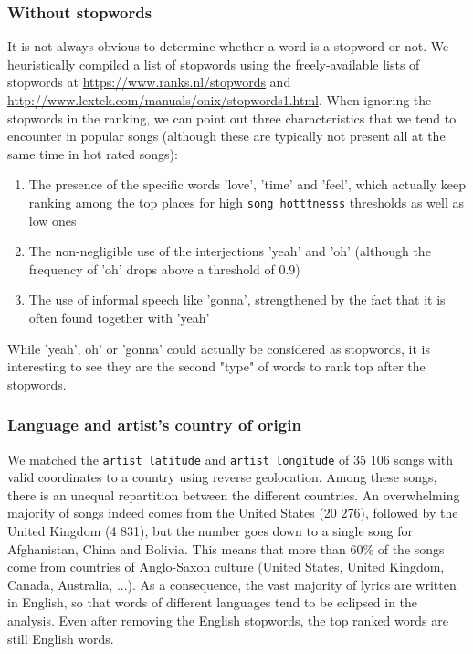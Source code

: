 \documentclass[11pt]{article}
\renewcommand\_{\textunderscore\allowbreak}
\begin{document}
\subsubsection{Without stopwords}
It is not always obvious to determine whether a word is a stopword or not. We heuristically compiled a list of stopwords using the freely-available lists of stopwords at \url{https://www.ranks.nl/stopwords} and \url{http://www.lextek.com/manuals/onix/stopwords1.html}.
When ignoring the stopwords in the ranking, we can point out three characteristics that we tend to encounter in popular songs (although these are typically not present all at the same time in hot rated songs):
\begin{enumerate}
\itemsep 0mm
\item The presence of the specific words 'love', 'time' and 'feel', which actually keep ranking among the top places for high \texttt{song hotttnesss} thresholds as well as low ones
\item The non-negligible use of the interjections 'yeah' and 'oh' (although the frequency of 'oh' drops above a threshold of 0.9)
\item The use of informal speech like 'gonna', strengthened by the fact that it is often found together with 'yeah'
\end{enumerate}
While 'yeah', oh' or 'gonna' could actually be considered as stopwords, it is interesting to see they are the second "type" of words to rank top after the stopwords.

\subsubsection{Language and artist's country of origin}
We matched the \texttt{artist latitude} and \texttt{artist longitude} of 35 106 songs with valid coordinates to a country using reverse geolocation.  %
Among these songs, there is an unequal repartition between the different countries.
An overwhelming majority of songs indeed comes from the United States (20 276), followed by the United Kingdom (4 831), but the number goes down to a single song for Afghanistan, China and Bolivia.
This means that more than 60\% of the songs come from countries of Anglo-Saxon culture (United States, United Kingdom, Canada, Australia, ...). As a consequence, the vast majority of lyrics are written in English, so that words of different languages tend to be eclipsed in the analysis.
Even after removing the English stopwords, the top ranked words are still English words.
\end{document}
